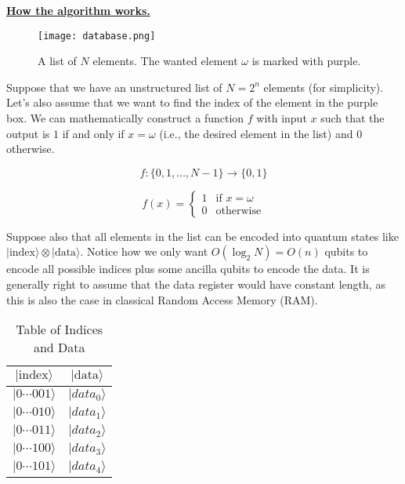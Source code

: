 \documentclass[12pt,a4paper]{report}
\begin{document}
\noindent
{\large \textbf{\underline{How the algorithm works.}}}

\begin{figure}[!h]
    \centering
    \texttt{[image: database.png]}
    \caption{A list of \(N\) elements. The wanted element \(\omega\) is marked with purple.}
    \label{fig:grov_database}
\end{figure}

\noindent
Suppose that we have an unstructured list of \( N = 2^n \) elements (for simplicity). Let's also assume that we want to find the index of the element in the purple box. We can mathematically construct a function \( f \) with input \( x \) such that the output is \( 1 \) if and only if \( x=\omega \) (i.e., the desired element in the list) and \( 0 \) otherwise.

\[ 
f: \{0, 1, \ldots, N-1\} \to \{0, 1\}
\]

\[
f(x) = 
\begin{cases} 
1 & \text{if } x = \omega \\
0 & \text{otherwise}
\end{cases}
\]

\noindent
Suppose also that all elements in the list can be encoded into quantum states like \( | \text{index} \rangle \otimes | \text{data} \rangle \). Notice how we only want \( O(\log_2 N) = O(n) \) qubits to encode all possible indices plus some ancilla qubits to encode the data. It is generally right to assume that the data register would have constant length, as this is also the case in classical Random Access Memory (RAM).

\begin{table}[h]
\centering
\begin{tabular}{|c|c|}
\hline
\textbf{$| \text{index} \rangle$} & \textbf{$| \text{data} \rangle$} \\
\hline
\(|0\cdots001\rangle\) & \(|data_0\rangle\) \\
\hline
\(|0\cdots010\rangle\) & \(|data_1\rangle\) \\
\hline
\(|0\cdots011\rangle\) & \(|data_2\rangle\) \\
\hline
\(|0\cdots100\rangle\) & \(|data_3\rangle\) \\
\hline
\(|0\cdots101\rangle\) & \(|data_4\rangle\) \\
\hline
\end{tabular}
\caption{Table of Indices and Data}
\label{tab:grover}
\end{table}
\end{document}
